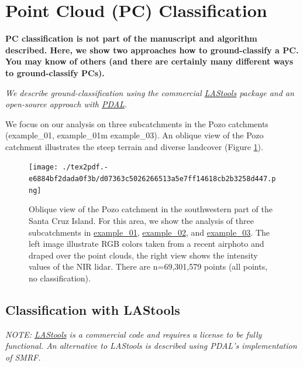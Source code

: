 \documentclass[a4paperpaper,,tablecaptionabove]{scrartcl}
\begin{document}
\hypertarget{point-cloud-pc-classification}{%
\section{Point Cloud (PC)
Classification}\label{point-cloud-pc-classification}}

\textbf{PC classification is not part of the manuscript and algorithm
described. Here, we show two approaches how to ground-classify a PC. You
may know of others (and there are certainly many different ways to
ground-classify PCs).}

\emph{We describe ground-classification using the commercial
\href{https://rapidlasso.com/lastools/}{LAStools} package and an
open-source approach with \href{https://pdal.io/}{PDAL}.}

We focus on our analysis on three subcatchments in the Pozo catchments
(example\_01, example\_01m example\_03). An oblique view of the Pozo
catchment illustrates the steep terrain and diverse landcover (Figure
\ref{Fig:PC_Pozo_color_intensity}).

\begin{figure}
\centering
\texttt{[image: ./tex2pdf.-e6884bf2dada0f3b/d07363c5026266513a5e7ff14618cb2b3258d447.png]}
\caption{Oblique view of the Pozo catchment in the southwestern part of
the Santa Cruz Island. For this area, we show the analysis of three
subcatchments in
\href{https://github.com/BodoBookhagen/PC_geomorph_roughness/tree/master/example_01}{example\_01},
\href{https://github.com/BodoBookhagen/PC_geomorph_roughness/tree/master/example_02}{example\_02},
and
\href{https://github.com/BodoBookhagen/PC_geomorph_roughness/tree/master/example_03}{example\_03}.
The left image illustrate RGB colors taken from a recent airphoto and
draped over the point clouds, the right view shows the intensity values
of the NIR lidar. There are n=69,301,579 points (all points, no
classification).\label{Fig:PC_Pozo_color_intensity}}
\end{figure}

\hypertarget{classification-with-lastools}{%
\subsection{Classification with
LAStools}\label{classification-with-lastools}}

\emph{NOTE: \href{https://rapidlasso.com/lastools/}{LAStools} is a
commercial code and requires a license to be fully functional. An
alternative to LAStools is described using PDAL's implementation of
SMRF.}
\end{document}
